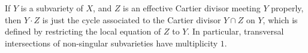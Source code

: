 If $Y$ is a subvariety of $X$, and $Z$ is an effective Cartier divisor meeting $Y$ properly, then $Y \cdot Z$ is just the cycle associated to the Cartier divisor $Y \cap Z$ on $Y$, which is defined by restricting the local equation of $Z$ to $Y$. In particular, transversal intersections of non-singular subvarieties have multiplicity $1$.
